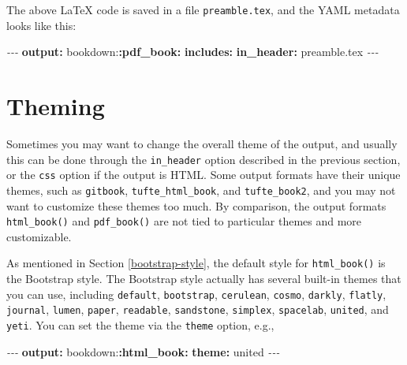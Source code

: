 \documentclass[
  12pt,
]{krantz}
\newenvironment{Shaded}{\begin{snugshade}}{\end{snugshade}}
\newcommand{\AttributeTok}[1]{\textcolor[rgb]{0.13,0.29,0.53}{#1}}
\newcommand{\FunctionTok}[1]{\textcolor[rgb]{0.13,0.29,0.53}{\textbf{#1}}}
\newcommand{\KeywordTok}[1]{\textcolor[rgb]{0.13,0.29,0.53}{\textbf{#1}}}
\newcommand{\PreprocessorTok}[1]{\textcolor[rgb]{0.56,0.35,0.01}{\textit{#1}}}
\begin{document}
The above LaTeX code is saved in a file \texttt{preamble.tex}, and the YAML metadata looks like this:

\begin{Shaded}
\begin{Highlighting}[]
\PreprocessorTok{{-}{-}{-}}
\FunctionTok{output}\KeywordTok{:}
\AttributeTok{  bookdown:}\FunctionTok{:pdf\_book}\KeywordTok{:}
\AttributeTok{    }\FunctionTok{includes}\KeywordTok{:}
\AttributeTok{      }\FunctionTok{in\_header}\KeywordTok{:}\AttributeTok{ preamble.tex}
\PreprocessorTok{{-}{-}{-}}
\end{Highlighting}
\end{Shaded}

\hypertarget{theming}{%
\section{Theming}\label{theming}}

Sometimes you may want to change the overall theme of the output, and usually this can be done through the \texttt{in\_header} option described in the previous section, or the \texttt{css} option if the output is HTML. Some output formats have their unique themes, such as \texttt{gitbook}, \texttt{tufte\_html\_book}, and \texttt{tufte\_book2}, and you may not want to customize these themes too much. By comparison, the output formats \texttt{html\_book()} and \texttt{pdf\_book()} are not tied to particular themes and more customizable.

As mentioned in Section \ref{bootstrap-style}, the default style for \texttt{html\_book()} is the Bootstrap style. The Bootstrap style actually has several built-in themes that you can use, including \texttt{default}, \texttt{bootstrap}, \texttt{cerulean}, \texttt{cosmo}, \texttt{darkly}, \texttt{flatly}, \texttt{journal}, \texttt{lumen}, \texttt{paper}, \texttt{readable}, \texttt{sandstone}, \texttt{simplex}, \texttt{spacelab}, \texttt{united}, and \texttt{yeti}. You can set the theme via the \texttt{theme} option, e.g.,

\begin{Shaded}
\begin{Highlighting}[]
\PreprocessorTok{{-}{-}{-}}
\FunctionTok{output}\KeywordTok{:}
\AttributeTok{  bookdown:}\FunctionTok{:html\_book}\KeywordTok{:}
\AttributeTok{    }\FunctionTok{theme}\KeywordTok{:}\AttributeTok{ united}
\PreprocessorTok{{-}{-}{-}}
\end{Highlighting}
\end{Shaded}
\end{document}
